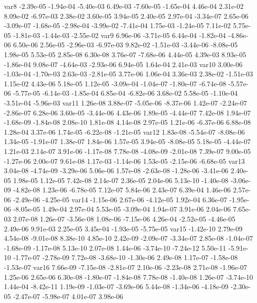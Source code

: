 var8 -2.39e-05 -1.94e-04 -5.40e-03  6.49e-03 -7.60e-05 -1.65e-04  4.46e-04  2.31e-02  8.09e-02 -6.97e-03  2.38e-02  3.60e-05  3.94e-05  2.40e-05  2.97e-04 -3.34e-07  2.65e-06 -3.09e-07 -1.68e-05 -2.98e-04 -3.99e-02 -7.41e-04  1.75e-03 -1.24e-05  7.11e-02  5.75e-05 -1.81e-03 -1.44e-03 -2.55e-02
var9  6.96e-06 -3.71e-05  6.44e-04 -1.82e-04 -4.86e-06  6.50e-06  2.56e-05 -2.96e-03 -6.97e-03  9.82e-02 -1.51e-03 -3.44e-06 -8.08e-05  1.98e-05  5.53e-05  2.85e-08  6.30e-08  3.76e-07 -7.68e-06  4.44e-05  4.39e-03  8.93e-05 -1.86e-04  9.08e-07 -4.64e-03 -2.93e-06  6.94e-05  1.64e-04  2.41e-03
var10  3.00e-06 -1.03e-04 -1.70e-03  2.63e-03 -2.81e-05  3.77e-06  1.06e-04  3.36e-03  2.38e-02 -1.51e-03  1.15e-02  4.43e-06  5.18e-05  1.12e-05 -3.09e-04 -1.04e-07 -1.80e-07 -6.74e-08 -5.57e-06 -5.77e-05 -6.14e-03 -1.85e-04  6.85e-04 -6.82e-06  3.68e-02  5.58e-05 -1.10e-04 -3.51e-04 -5.96e-03
var11  1.26e-08  3.88e-07 -5.05e-06 -8.37e-06  1.42e-07 -2.24e-07 -2.86e-07  6.28e-06  3.60e-05 -3.44e-06  4.43e-06  1.89e-05 -4.44e-07  7.42e-08  1.94e-07 -1.68e-09 -1.84e-08  2.08e-10  1.81e-08  4.14e-08  2.97e-05  1.21e-06 -6.37e-06  6.88e-08  1.28e-04  3.37e-06  1.74e-05 -6.22e-08 -1.21e-05
var12  1.83e-08 -5.54e-07 -8.08e-06  1.34e-05 -1.91e-07  1.38e-07  1.84e-06  1.57e-05  3.94e-05 -8.08e-05  5.18e-05 -4.44e-07  1.21e-03  2.14e-07  3.91e-06 -1.17e-08  7.78e-08 -4.08e-09 -2.01e-08  7.39e-07  9.00e-05 -1.27e-06  2.00e-07  9.61e-08  1.17e-03 -1.14e-06  1.53e-05 -2.15e-06 -6.68e-05
var13  3.04e-08 -4.74e-09 -3.29e-06  5.06e-06  1.57e-08 -2.63e-08 -1.28e-06 -3.41e-06  2.40e-05  1.98e-05  1.12e-05  7.42e-08  2.14e-07  2.36e-05  2.04e-06  5.13e-10 -1.40e-08 -3.06e-09 -4.82e-08  1.23e-06 -6.78e-05  7.12e-07  5.84e-06  2.43e-07  6.39e-04  1.46e-06  2.57e-06 -2.49e-06 -4.25e-05
var14 -1.15e-06  2.67e-06 -4.12e-05  1.92e-04  6.36e-07 -1.95e-06 -8.05e-05  1.49e-04  2.97e-04  5.53e-05 -3.09e-04  1.94e-07  3.91e-06  2.04e-06  7.65e-03  2.07e-08  1.26e-07 -3.56e-08  1.08e-06 -7.15e-06  4.26e-04 -2.52e-05 -4.46e-05  2.49e-06  9.91e-03  2.25e-05  3.45e-04 -1.93e-05 -5.75e-05
var15 -1.42e-10  2.79e-09  4.54e-08 -9.01e-08  8.38e-10  4.85e-10  2.42e-09 -2.09e-07 -3.34e-07  2.85e-08 -1.04e-07 -1.68e-09 -1.17e-08  5.13e-10  2.07e-08  1.44e-06 -3.74e-10 -7.24e-12  5.50e-11 -5.91e-10 -1.77e-07 -2.78e-09  7.72e-08 -3.68e-10 -1.30e-06  2.49e-08  1.17e-07 -1.58e-08 -1.53e-07
var16  7.66e-09 -7.15e-08 -2.81e-07  2.10e-06 -2.23e-08  2.71e-08 -1.96e-07  1.25e-06  2.65e-06  6.30e-08 -1.80e-07 -1.84e-08  7.78e-08 -1.40e-08  1.26e-07 -3.74e-10  1.44e-04 -8.42e-11  1.19e-09 -1.03e-07 -3.69e-06  5.44e-08 -1.34e-06 -4.18e-09 -2.30e-05 -2.47e-07 -5.98e-07  4.01e-07  3.98e-06
